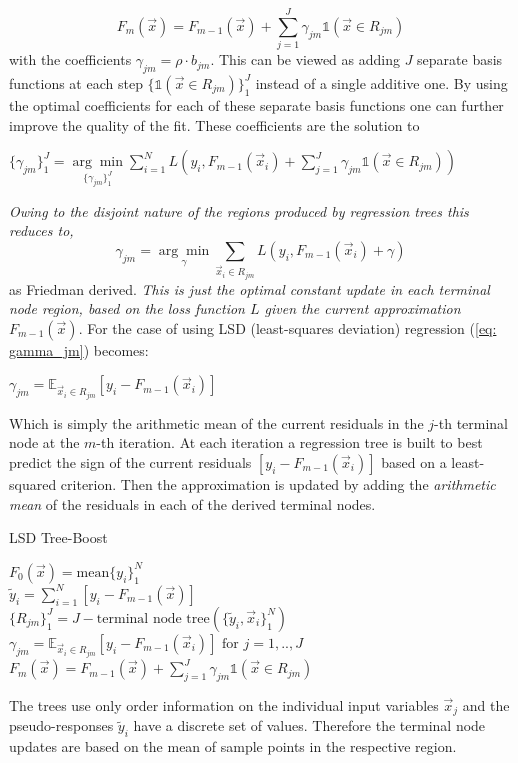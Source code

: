 \documentclass[12pt, a4paper]{article}
\begin{document}
\begin{equation}
        F_m(\vec{x}) = F_{m-1}(\vec{x}) + \sum_{j=1}^J \gamma_{jm} \mathds{1}(\vec{x} \in R_{jm})
\end{equation}
with the coefficients $\gamma_{jm} = \rho \cdot b_{jm}$. This can be viewed as adding $J$ separate basis functions at each step $\{\mathds{1}(\vec{x} \in R_{jm})\}_1^J$ instead of a single additive one. By using the optimal coefficients for each of these separate basis functions  one can further improve the quality of the fit.
These coefficients are the solution to
\begin{center}
    $\{\gamma_{jm}\}_1^J = \underset{\{\gamma_{jm}\}_1^J}{\arg\min} \sum_{i=1}^N L\left(y_i,F_{m-1}(\vec{x}_i) + \sum_{j=1}^J \gamma_{jm} \mathds{1}(\vec{x} \in R_{jm})\right)$
\end{center}
\textit{Owing to the disjoint nature of the regions produced by regression trees this reduces to,}
\begin{equation}
        \label{eq: gamma_jm}
        \gamma_{jm} = \underset{\gamma}{\arg\min} \sum_{\vec{x}_i \in R_{jm}} L\left(y_i,F_{m-1}(\vec{x}_i) + \gamma\right)
\end{equation}
as Friedman \cite{Friedman2001} derived. \textit{This is just the optimal constant update in each terminal node region, based on the loss function $L$ given the current approximation $F_{m-1}(\vec{x})$}. For the case of using LSD (least-squares deviation) regression (\ref{eq: gamma_jm}) becomes:
\begin{center}
    $\gamma_{jm} = \mathbb{E}_{\vec{x}_i \in R_{jm}}[y_i - F_{m-1}(\vec{x}_i)]$
\end{center}
Which is simply the arithmetic mean of the current residuals in the $j$-th terminal node at the $m$-th iteration. At each iteration a regression tree is built to best predict the sign of the current residuals $[y_i - F_{m-1}(\vec{x}_i)]$ based on a least-squared criterion. Then the approximation is updated by adding the \textit{arithmetic mean} of the residuals in each of the derived terminal nodes.
\\
\begin{algorithm}
\caption{LSD Tree-Boost}
\label{alg: lsd_tree_boost_algo}
    $F_0(\vec{x}) = \text{mean}\{y_i\}_1^N$ \\
    {
    $\tilde{y}_i = \sum_{i=1}^N [y_i - F_{m-1}(\vec{x})]$ \\
    $\{R_{jm}\}_1^J = J-\text{terminal node tree}(\{\tilde{y}_i,\vec{x}_i\}_1^N)$ \\
    $\gamma_{jm} = \mathbb{E}_{\vec{x}_i \in R_{jm}}[y_i - F_{m-1}(\vec{x}_i)] \text{ for } j = 1,..,J$ \\
    $F_m(\vec{x}) = F_{m-1}(\vec{x}) + \sum_{j=1}^J \gamma_{jm} \mathds{1}(\vec{x} \in R_{jm})$
    }
\end{algorithm}
The trees use only order information on the individual input variables $\vec{x}_j$ and the pseudo-responses $\tilde{y}_i$ have a discrete set of values. Therefore the terminal node updates are based on the mean of sample points in the respective region.
\end{document}
